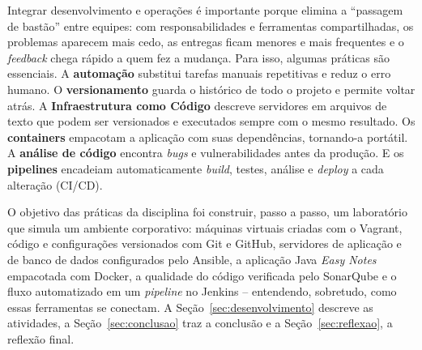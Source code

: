 Integrar desenvolvimento e operações é importante porque elimina a ``passagem de bastão'' entre
equipes: com responsabilidades e ferramentas compartilhadas, os problemas aparecem mais cedo, as
entregas ficam menores e mais frequentes e o \textit{feedback} chega rápido a quem fez a mudança.
Para isso, algumas práticas são essenciais. A \textbf{automação} substitui tarefas manuais
repetitivas e reduz o erro humano. O \textbf{versionamento} guarda o histórico de todo o projeto e
permite voltar atrás. A \textbf{Infraestrutura como Código} descreve servidores em arquivos de texto
que podem ser versionados e executados sempre com o mesmo resultado. Os \textbf{containers}
empacotam a aplicação com suas dependências, tornando-a portátil. A \textbf{análise de código}
encontra \textit{bugs} e vulnerabilidades antes da produção. E os \textbf{pipelines} encadeiam
automaticamente \textit{build}, testes, análise e \textit{deploy} a cada alteração (CI/CD).

O objetivo das práticas da disciplina foi construir, passo a passo, um laboratório que simula um
ambiente corporativo: máquinas virtuais criadas com o Vagrant, código e configurações versionados
com Git e GitHub, servidores de aplicação e de banco de dados configurados pelo Ansible, a aplicação
Java \textit{Easy Notes} empacotada com Docker, a qualidade do código verificada pelo SonarQube e o
fluxo automatizado em um \textit{pipeline} no Jenkins -- entendendo, sobretudo, como essas
ferramentas se conectam. A Seção~\ref{sec:desenvolvimento} descreve as atividades, a
Seção~\ref{sec:conclusao} traz a conclusão e a Seção~\ref{sec:reflexao}, a reflexão final.
